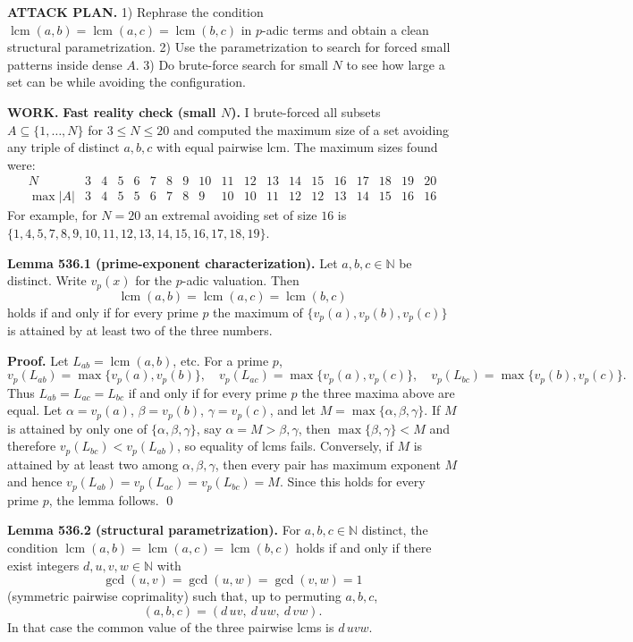 \noindent\textbf{ATTACK PLAN.}
1) Rephrase the condition $\operatorname{lcm}(a,b)=\operatorname{lcm}(a,c)=\operatorname{lcm}(b,c)$ in $p$-adic terms and obtain a clean structural parametrization.
2) Use the parametrization to search for forced small patterns inside dense $A$.
3) Do brute-force search for small $N$ to see how large a set can be while avoiding the configuration.

\noindent\textbf{WORK.}
\textbf{Fast reality check (small $N$).}
I brute-forced all subsets $A\subseteq\{1,\dots,N\}$ for $3\le N\le 20$ and computed the maximum size of a set avoiding any triple of distinct $a,b,c$ with equal pairwise lcm.
The maximum sizes found were:
\[
\begin{array}{c|cccccccccccccccccc}
N&3&4&5&6&7&8&9&10&11&12&13&14&15&16&17&18&19&20\\\hline
\max|A|&3&4&5&5&6&7&8&9&10&10&11&12&12&13&14&15&16&16
\end{array}
\]
For example, for $N=20$ an extremal avoiding set of size $16$ is
$\{1,4,5,7,8,9,10,11,12,13,14,15,16,17,18,19\}$.

\medskip
\textbf{Lemma 536.1 (prime-exponent characterization).}
Let $a,b,c\in\mathbb N$ be distinct. Write $v_p(x)$ for the $p$-adic valuation. Then
\[
\operatorname{lcm}(a,b)=\operatorname{lcm}(a,c)=\operatorname{lcm}(b,c)
\]
holds if and only if for every prime $p$ the maximum of $\{v_p(a),v_p(b),v_p(c)\}$ is attained by at least two of the three numbers.

\textbf{Proof.}
Let $L_{ab}=\operatorname{lcm}(a,b)$, etc. For a prime $p$,
\[
 v_p(L_{ab})=\max\{v_p(a),v_p(b)\},\quad
 v_p(L_{ac})=\max\{v_p(a),v_p(c)\},\quad
 v_p(L_{bc})=\max\{v_p(b),v_p(c)\}.
\]
Thus $L_{ab}=L_{ac}=L_{bc}$ if and only if for every prime $p$ the three maxima above are equal.
Let $\alpha=v_p(a)$, $\beta=v_p(b)$, $\gamma=v_p(c)$, and let $M=\max\{\alpha,\beta,\gamma\}$.
If $M$ is attained by only one of $\{\alpha,\beta,\gamma\}$, say $\alpha=M>\beta,\gamma$, then $\max\{\beta,\gamma\}<M$ and therefore $v_p(L_{bc})<v_p(L_{ab})$, so equality of lcms fails.
Conversely, if $M$ is attained by at least two among $\alpha,\beta,\gamma$, then every pair has maximum exponent $M$ and hence $v_p(L_{ab})=v_p(L_{ac})=v_p(L_{bc})=M$.
Since this holds for every prime $p$, the lemma follows. \qed

\medskip
\textbf{Lemma 536.2 (structural parametrization).}
For $a,b,c\in\mathbb N$ distinct, the condition
$\operatorname{lcm}(a,b)=\operatorname{lcm}(a,c)=\operatorname{lcm}(b,c)$
holds if and only if there exist integers $d,u,v,w\in\mathbb N$ with
\[
\gcd(u,v)=\gcd(u,w)=\gcd(v,w)=1
\]
(symmetric pairwise coprimality) such that, up to permuting $a,b,c$,
\[
(a,b,c)=(d\,u v,\ d\,u w,\ d\,v w).
\]
In that case the common value of the three pairwise lcms is $d\,u v w$.

